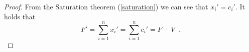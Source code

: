 \begin{proof}
   From the Saturation theorem (\ref{saturation}) we can see that $x_i' = c_i'$. It holds that
   \begin{equation*}
     F' = \sum\limits_{i=1}^nx_i' = \sum\limits_{i=1}^nc_i' = F - V \enspace.
   \end{equation*}
\end{proof}
